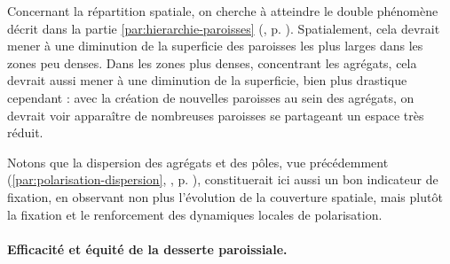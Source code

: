 Concernant la répartition spatiale, on cherche à atteindre le double phénomène décrit dans la partie \ref{par:hierarchie-paroisses} (, p. \pageref{par:hierarchie-paroisses}).
Spatialement, cela devrait mener à une diminution de la superficie des paroisses les plus larges dans les zones peu denses.
Dans les zones plus denses, concentrant les agrégats, cela devrait aussi mener à une diminution de la superficie, bien plus drastique cependant : avec la création de nouvelles paroisses au sein des agrégats, on devrait voir apparaître de nombreuses paroisses se partageant un espace très réduit.

Notons que la dispersion des agrégats et des pôles, vue précédemment (\ref{par:polarisation-dispersion}, , p. \pageref{par:polarisation-dispersion}), constituerait ici aussi un bon indicateur de fixation, en observant non plus l'évolution de la couverture spatiale, mais plutôt la fixation et le renforcement des dynamiques locales de polarisation.

\paragraph{Efficacité et équité de la desserte paroissiale.}

